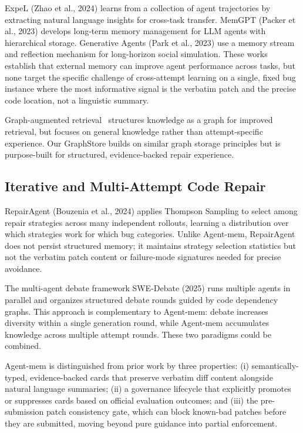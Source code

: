 \documentclass{article}
\begin{document}
ExpeL (Zhao et al., 2024) learns from a collection of agent trajectories by extracting natural language insights for cross-task transfer. MemGPT (Packer et al., 2023) develops long-term memory management for LLM agents with hierarchical storage. Generative Agents (Park et al., 2023) use a memory stream and reflection mechanism for long-horizon social simulation. These works establish that external memory can improve agent performance across tasks, but none target the specific challenge of cross-attempt learning on a single, fixed bug instance where the most informative signal is the verbatim patch and the precise code location, not a linguistic summary.

Graph-augmented retrieval~\cite{han2024graphrag} structures knowledge as a graph for improved retrieval, but focuses on general knowledge rather than attempt-specific experience. Our GraphStore builds on similar graph storage principles but is purpose-built for structured, evidence-backed repair experience.

\subsection{Iterative and Multi-Attempt Code Repair}

RepairAgent (Bouzenia et al., 2024) applies Thompson Sampling to select among repair strategies across many independent rollouts, learning a distribution over which strategies work for which bug categories. Unlike Agent-mem, RepairAgent does not persist structured memory; it maintains strategy selection statistics but not the verbatim patch content or failure-mode signatures needed for precise avoidance.

The multi-agent debate framework SWE-Debate (2025) runs multiple agents in parallel and organizes structured debate rounds guided by code dependency graphs. This approach is complementary to Agent-mem: debate increases diversity within a single generation round, while Agent-mem accumulates knowledge across multiple attempt rounds. These two paradigms could be combined.

Agent-mem is distinguished from prior work by three properties: (i) semantically-typed, evidence-backed cards that preserve verbatim diff content alongside natural language summaries; (ii) a governance lifecycle that explicitly promotes or suppresses cards based on official evaluation outcomes; and (iii) the pre-submission patch consistency gate, which can block known-bad patches before they are submitted, moving beyond pure guidance into partial enforcement.
\end{document}

